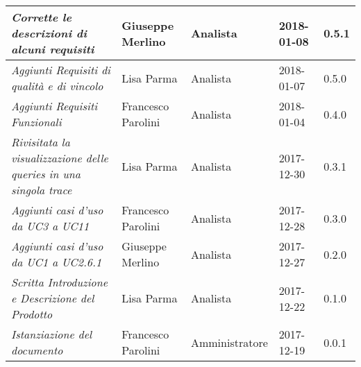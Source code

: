 \begin{table}[H]
\begin{tabular}{p{4cm}|C{3cm}|C{3cm}|R{2.5cm}|R{2cm}}
		\emph{Corrette le descrizioni di alcuni requisiti}& Giuseppe Merlino & Analista & 2018-01-08 & 0.5.1 \\
		\hline
		
		\emph{Aggiunti Requisiti di qualità e di vincolo}& Lisa Parma & Analista & 2018-01-07 & 0.5.0 \\
		\hline
		
		\emph{Aggiunti Requisiti Funzionali}& Francesco Parolini & Analista & 2018-01-04 & 0.4.0 \\
		\hline
		
		\emph{Rivisitata la visualizzazione delle queries in una singola trace}& Lisa Parma & Analista & 2017-12-30 & 0.3.1 \\
		\hline
		
		\emph{Aggiunti casi d'uso da UC3 a UC11}& Francesco Parolini & Analista & 2017-12-28 & 0.3.0 \\
		\hline
		
		\emph{Aggiunti casi d'uso da UC1 a UC2.6.1}& Giuseppe Merlino & Analista & 2017-12-27 & 0.2.0 \\
		\hline
		
		\emph{Scritta Introduzione e Descrizione del Prodotto}& Lisa Parma & Analista & 2017-12-22 & 0.1.0 \\
		\hline
		
		\emph{Istanziazione del documento}& Francesco Parolini & Amministratore & 2017-12-19 & 0.0.1 \\
		\hline
		
	\end{tabular}
	
\end{table}


\clearpage